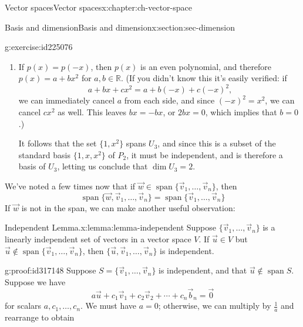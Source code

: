 \documentclass[oneside,10pt,]{book}
\numberwithin{equation}{section}
\newcommand{\spn}{\operatorname{span}}
\newcommand{\R}{\mathbb{R}}
\begin{document}
\begin{chapterptx}{Vector spaces}{}{Vector spaces}{}{}{x:chapter:ch-vector-space}
\begin{sectionptx}{Basis and dimension}{}{Basis and dimension}{}{}{x:section:sec-dimension}
\begin{inlineexercise}{}{g:exercise:id225076}
\begin{enumerate}[label=\alph*]
\begin{equation*}
p(x) = (x-1)(ax+b) = a(x^2-x)+b(x-1)\text{.}
\end{equation*}
Since \(p\) was arbitrary, this shows that \(U_2 = \spn\{x^2-x,x-1\}\).%
\par
The set \(\{x^2-x,x-1\}\) is also independent, since neither vector is a scalar multiple of the other. Therefore, this set is a basis, and \(\dim U_2=2\).%
\item{}If \(p(x)=p(-x)\), then \(p(x)\) is an even polynomial, and therefore \(p(x)=a+bx^2\) for \(a,b\in\R\). (If you didn't know this it's easily verified: if%
\begin{equation*}
a+bx+cx^2 = a+b(-x)+c(-x)^2\text{,}
\end{equation*}
we can immediately cancel \(a\) from each side, and since \((-x)^2=x^2\), we can cancel \(cx^2\) as well. This leaves \(bx=-bx\), or \(2bx=0\), which implies that \(b=0\).)%
\par
It follows that the set \(\{1,x^2\}\) spans \(U_3\), and since this is a subset of the standard basis \(\{1,x,x^2\}\) of \(P_2\), it must be independent, and is therefore a basis of \(U_3\), letting us conclude that \(\dim U_3=2\).%
\end{enumerate}
%
\end{inlineexercise}
We've noted a few times now that if \(\vec{w}\in\spn\{\vec{v}_1,\ldots, \vec{v}_n\}\), then%
\begin{equation*}
\spn\{\vec{w},\vec{v}_1,\ldots, \vec{v}_n\}=\spn\{\vec{v}_1,\ldots, \vec{v}_n\}
\end{equation*}
If \(\vec{w}\) is not in the span, we can make another useful observation:%
\begin{lemma}{Independent Lemma.}{}{x:lemma:lemma-independent}%
Suppose \(\{\vec{v}_1,\ldots, \vec{v}_n\}\) is a linearly independent set of vectors in a vector space \(V\). If \(\vec{u}\in V\) but \(\vec{u}\notin \spn\{\vec{v}_1,\ldots, \vec{v}_n\}\), then \(\{\vec{u},\vec{v}_1,\ldots, \vec{v}_n\}\) is independent.%
\end{lemma}
\begin{proofptx}{}{g:proof:id317148}
Suppose \(S=\{\vec{v}_1,\ldots, \vec{v}_n\}\) is independent, and that \(\vec{u}\notin\spn S\). Suppose we have%
\begin{equation*}
a\vec{u}+c_1\vec{v}_1+c_2\vec{v}_2+\cdots +c_n\vec{b}_n=\vec{0}
\end{equation*}
for scalars \(a,c_1,\ldots, c_n\). We must have \(a=0\); otherwise, we can multiply by \(\frac1a\) and rearrange to obtain%

\end{proofptx}
\end{sectionptx}
\end{chapterptx}
\end{document}
